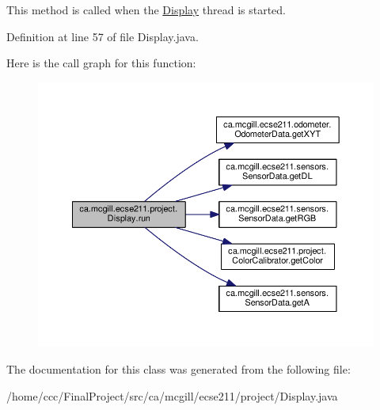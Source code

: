 This method is called when the \hyperlink{classca_1_1mcgill_1_1ecse211_1_1project_1_1_display}{Display} thread is started. 

Definition at line 57 of file Display.\+java.

Here is the call graph for this function\+:
\nopagebreak
\begin{figure}[H]
\begin{center}
\leavevmode
\includegraphics[width=350pt]{classca_1_1mcgill_1_1ecse211_1_1project_1_1_display_ab508a8bc2b738499bec2c432a814cba5_cgraph}
\end{center}
\end{figure}


The documentation for this class was generated from the following file\+:\begin{DoxyCompactItemize}
\item 
/home/ccc/\+Final\+Project/src/ca/mcgill/ecse211/project/Display.\+java\end{DoxyCompactItemize}
